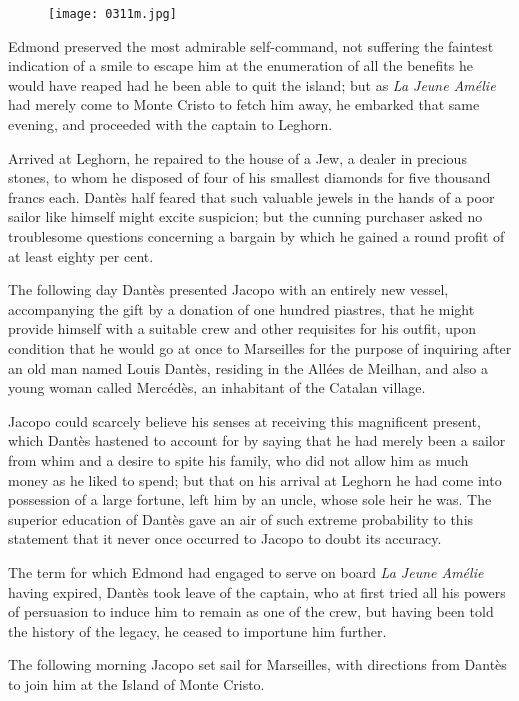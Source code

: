 \begin{figure}[ht]
\texttt{[image: 0311m.jpg]}
\end{figure}

Edmond preserved the most admirable self-command, not suffering the
faintest indication of a smile to escape him at the enumeration of all
the benefits he would have reaped had he been able to quit the island;
but as \textit{La Jeune Amélie} had merely come to Monte Cristo to fetch him
away, he embarked that same evening, and proceeded with the captain to
Leghorn.

Arrived at Leghorn, he repaired to the house of a Jew, a dealer in
precious stones, to whom he disposed of four of his smallest diamonds
for five thousand francs each. Dantès half feared that such valuable
jewels in the hands of a poor sailor like himself might excite
suspicion; but the cunning purchaser asked no troublesome questions
concerning a bargain by which he gained a round profit of at least
eighty per cent.

The following day Dantès presented Jacopo with an entirely new vessel,
accompanying the gift by a donation of one hundred piastres, that he
might provide himself with a suitable crew and other requisites for his
outfit, upon condition that he would go at once to Marseilles for the
purpose of inquiring after an old man named Louis Dantès, residing in
the Allées de Meilhan, and also a young woman called Mercédès, an
inhabitant of the Catalan village.

Jacopo could scarcely believe his senses at receiving this magnificent
present, which Dantès hastened to account for by saying that he had
merely been a sailor from whim and a desire to spite his family, who
did not allow him as much money as he liked to spend; but that on his
arrival at Leghorn he had come into possession of a large fortune, left
him by an uncle, whose sole heir he was. The superior education of
Dantès gave an air of such extreme probability to this statement that
it never once occurred to Jacopo to doubt its accuracy.

The term for which Edmond had engaged to serve on board \textit{La Jeune
Amélie} having expired, Dantès took leave of the captain, who at first
tried all his powers of persuasion to induce him to remain as one of
the crew, but having been told the history of the legacy, he ceased to
importune him further.

The following morning Jacopo set sail for Marseilles, with directions
from Dantès to join him at the Island of Monte Cristo.

